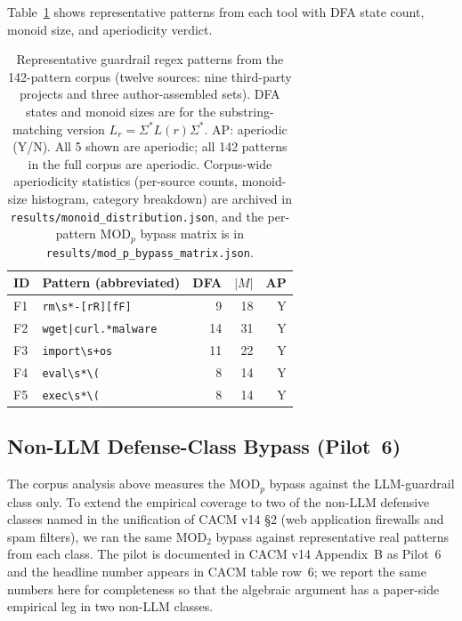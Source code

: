 \documentclass[letterpaper,twocolumn,10pt]{article}
\theoremstyle{definition}
\theoremstyle{remark}
\begin{document}
Table~\ref{tab:corpus} shows representative patterns from each tool with DFA state
count, monoid size, and aperiodicity verdict.

\begin{table}[t]
\centering
\caption{Representative guardrail regex patterns from the 142-pattern corpus
(twelve sources: nine third-party projects and three author-assembled sets).
DFA states and monoid sizes are for the substring-matching version
$L_r = \Sigma^* L(r) \Sigma^*$.
AP: aperiodic (Y/N). All 5 shown are aperiodic; all 142 patterns in the
full corpus are aperiodic. Corpus-wide aperiodicity statistics
(per-source counts, monoid-size histogram, category breakdown) are
archived in \texttt{results/monoid\_distribution.json}, and the per-pattern
$\mathrm{MOD}_p$ bypass matrix is in \texttt{results/mod\_p\_bypass\_matrix.json}.}
\label{tab:corpus}
\small
\begin{tabularx}{\columnwidth}{lXrrr}
\toprule
ID & Pattern (abbreviated) & DFA & $|M|$ & AP \\
\midrule
F1 & \texttt{rm\textbackslash s*-[rR][fF]} & 9 & 18 & Y \\
F2 & \texttt{wget|curl.*malware} & 14 & 31 & Y \\
F3 & \texttt{import\textbackslash s+os} & 11 & 22 & Y \\
F4 & \texttt{eval\textbackslash s*\textbackslash(} & 8 & 14 & Y \\
F5 & \texttt{exec\textbackslash s*\textbackslash(} & 8 & 14 & Y \\
\bottomrule
\end{tabularx}
\end{table}

\subsection{Non-LLM Defense-Class Bypass (Pilot~6)}\label{sec:non-llm-pilot}

The corpus analysis above measures the $\mathrm{MOD}_p$ bypass against the
LLM-guardrail class only. To extend the empirical coverage to two of the
non-LLM defensive classes named in the unification of CACM v14 \S2 (web
application firewalls and spam filters), we ran the same $\mathrm{MOD}_2$
bypass against representative real patterns from each class. The pilot is
documented in CACM v14 Appendix~B as Pilot~6 and the headline number
appears in CACM table row~6; we report the same numbers here for
completeness so that the algebraic argument has a paper-side empirical
leg in two non-LLM classes.
\end{document}
